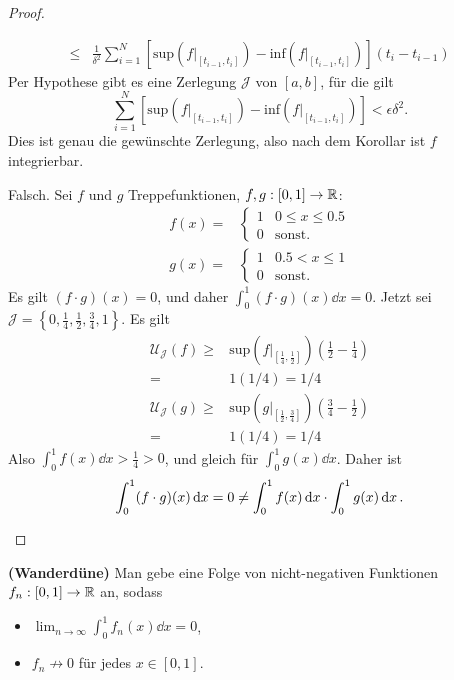 \begin{proof}
\begin{parts}
\begin{align*}
			\le&\frac{1}{\delta^2}\sum_{i=1}^N\left[\text{sup}\left( f|_{[t_{i-1},t_i]} \right) -\text{inf}\left( f|_{[t_{i-1},t_i]}\right)\right](t_i-t_{i-1})
		\end{align*}
		Per Hypothese gibt es eine Zerlegung $\mathcal{J}$ von $[a,b]$, f\"{u}r die gilt
		\[
			\sum_{i=1}^{N}\left[ \text{sup}\left( f|_{[t_{i-1},t_i]} \right) -\text{inf}\left( f|_{[t_{i-1},t_i]} \right)  \right] < \epsilon\delta^2
		.\]
		Dies ist genau die gewünschte Zerlegung, also nach dem Korollar ist $f$ integrierbar.
	\item Falsch. Sei $f$ und $g$ Treppefunktionen, $f,g:[0,1]\to \mathbb{R}$:
		\begin{align*}
			f(x)=&\begin{cases}
				1 & 0 \le x \le 0.5\\
				0 & \text{sonst}.
			\end{cases}\\
				g(x)=&\begin{cases}
					1 & 0.5 < x \le 1\\
					0 & \text{sonst}.
				\end{cases}
		\end{align*}
		Es gilt $(f\cdot g)(x)=0$, und daher $\int_0^1 (f\cdot g)(x)\dd{x}=0$. Jetzt sei $\mathcal{J}=\left\{ 0,\frac{1}{4},\frac{1}{2},\frac{3}{4},1 \right\} $. Es gilt
		\begin{align*}
			\mathcal{U}_\mathcal{J}\left( f \right) \ge& \text{sup}\left( f|_{\left[\frac{1}{4},\frac{1}{2}\right]} \right)\left( \frac{1}{2}-\frac{1}{4} \right)\\
				=&1(1 / 4)= 1 / 4\\
				\mathcal{U}_\mathcal{J}(g)\ge& \text{sup}\left( g|_{\left[ \frac{1}{2},\frac{3}{4} \right] }  \right)\left( \frac{3}{4}-\frac{1}{2} \right) \\
				=&1(1 / 4)=1 /4
			\end{align*}
			Also $\int_0^1 f(x)\dd{x} > \frac{1}{4}>0$, und gleich f\"{u}r $\int_0^1 g(x)\dd{x}$. Daher ist
			\[
				\int_0^1 (f\cdot g)(x)\dd{x}=0\neq \int_0^1 f(x)\dd{x}\cdot \int_0^1 g(x)\dd{x}
			.\qedhere\] 
	\end{parts}
\end{proof}
\begin{Problem}
	\textbf{(Wanderdüne)}	Man gebe eine Folge von nicht-negativen Funktionen $f_n:[0,1]\to \mathbb{R}$ an, sodass
	\begin{itemize}
		\item $\lim_{n \to \infty} \int_0^1 f_n(x)\dd{x}=0$,
		\item $f_n\not\to0$ f\"{u}r jedes $x\in [0,1]$.
	\end{itemize}
\end{Problem}
